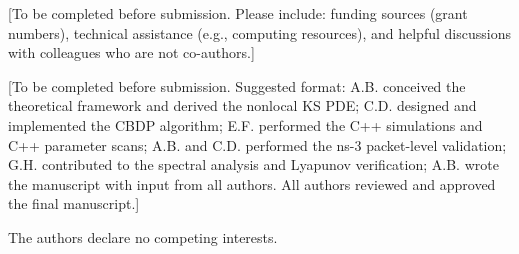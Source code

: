 \documentclass[sn-nature,pdflatex]{sn-jnl}
\begin{document}
[To be completed before submission. Please include: funding sources (grant numbers), technical assistance (e.g., computing resources), and helpful discussions with colleagues who are not co-authors.]

[To be completed before submission. Suggested format: A.B. conceived the theoretical framework and derived the nonlocal KS PDE; C.D. designed and implemented the CBDP algorithm; E.F. performed the C++ simulations and C++ parameter scans; A.B. and C.D. performed the ns-3 packet-level validation; G.H. contributed to the spectral analysis and Lyapunov verification; A.B. wrote the manuscript with input from all authors. All authors reviewed and approved the final manuscript.]

The authors declare no competing interests.
\end{document}
